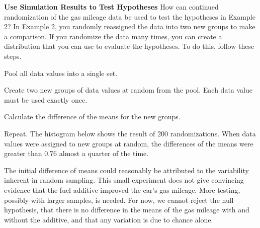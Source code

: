 \documentclass{article}
\newenvironment{example}[1]{}{}         %
\newcommand{\answer}[1]{}               %
\newcommand{\placeholder}[2]{}          %
\newcommand{\te}[1]{}                   %
\begin{document}
\begin{example}{3}
\textbf{Use Simulation Results to Test Hypotheses}
How can continued randomization of the gas mileage data be used to test the hypotheses in Example 2?
In Example 2, you randomly reassigned the data into two new groups to make a comparison. If you randomize the data many times, you can create a distribution that you can use to evaluate the hypotheses. To do this, follow these steps.
\item Pool all data values into a single set.
\item Create two new groups of data values at random from the pool. Each data value must be used exactly once.
\item Calculate the difference of the means for the new groups.
\item Repeat. The histogram below shows the result of 200 randomizations.
When data values were assigned to new groups at random, the differences of the means were greater than 0.76 almost a quarter of the time.
\placeholder{graph}{Pale blue histogram, horizontal Difference of Means ticks -3 through 3 every 1; vertical Frequency 0 to 80 every 20. Six unit-width bins from -3 to 3 labeled with counts 4,26,71,74,22,3. Red vertical line at approximately 0.76 in the 0–1 bin. No arrows.}
\te{Callout: In this distribution, the original difference of sample means is not that unusual.}
\te{COMMON ERROR The initial experiment relied on a very small sample. It is difficult to establish definitive results with a small sample. Repeat the experiment with a greater number of trials.}
The initial difference of means could reasonably be attributed to the variability inherent in random sampling.
This small experiment does not give convincing evidence that the fuel additive improved the car's gas mileage. More testing, possibly with larger samples, is needed. For now, we cannot reject the null hypothesis, that there is no difference in the means of the gas mileage with and without the additive, and that any variation is due to chance alone.
\answer{The initial difference could reasonably be due to sampling variability; we cannot reject the null hypothesis.}
\end{example}
\end{document}
